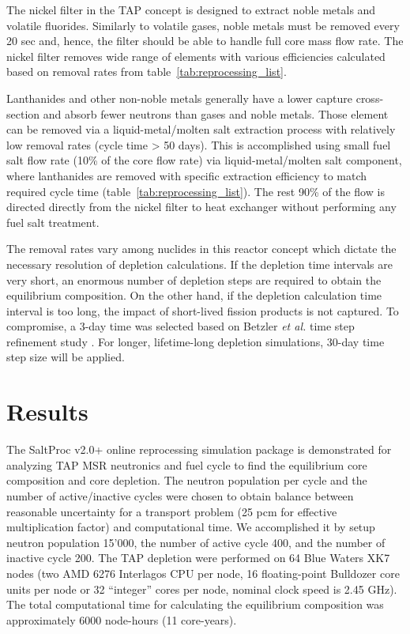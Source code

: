 \documentclass[12pt]{article} %
\begin{document}
The nickel filter in the \gls{TAP} concept is designed to extract noble metals and 
volatile fluorides. Similarly to volatile gases, noble metals must be removed 
every 20 sec and, hence, the filter should be able to handle full core mass 
flow rate. The nickel filter removes wide range of elements with various 
efficiencies calculated based on removal rates from table~\ref{tab:reprocessing_list}.

Lanthanides and other non-noble metals generally have a lower capture cross-section 
and absorb fewer neutrons than gases and noble metals. Those element can be removed 
via a liquid-metal/molten salt extraction process with relatively low removal rates 
(cycle time > 50 days). This is accomplished using small fuel salt flow rate (10\% 
of the core flow rate) via liquid-metal/molten salt component, where lanthanides are 
removed with specific extraction efficiency to match required cycle time (table~\ref{tab:reprocessing_list}). The rest 90\% of the flow is directed directly from the 
nickel filter to heat exchanger without performing any fuel salt treatment.

The removal rates vary among nuclides in this reactor concept which dictate the 
necessary resolution of depletion calculations. If the depletion time intervals 
are very short, an enormous number of depletion steps are required to obtain 
the equilibrium composition. On the other hand, if the depletion calculation time 
interval is too long, the impact of short-lived fission products is not captured. To compromise, a 3-day time was selected based on Betzler \emph{et al.} time step 
refinement study \cite{betzler_assessment_2017}. For longer, lifetime-long 
depletion simulations, 30-day time step size will be applied.

\section{Results}
The SaltProc v2.0+ online reprocessing simulation package is demonstrated for 
analyzing \gls{TAP} \gls{MSR} neutronics and fuel cycle to find the equilibrium core composition and core depletion. The neutron population per cycle and the number 
of active/inactive cycles were chosen to obtain balance between reasonable 
uncertainty for a transport problem (25 pcm for effective multiplication factor) 
and computational time. We accomplished it by setup neutron population 15'000, 
the number of active cycle 400, and the number of inactive cycle 200. 
The \gls{TAP} depletion were performed on 64 Blue Waters 
XK7 nodes (two AMD 6276 Interlagos CPU per node, 16 floating-point Bulldozer 
core units per node or 32 ``integer'' cores per node, nominal clock speed is 
2.45 GHz). The total computational time for calculating the equilibrium 
composition was approximately 6000 node-hours (11 core-years).
\end{document}
